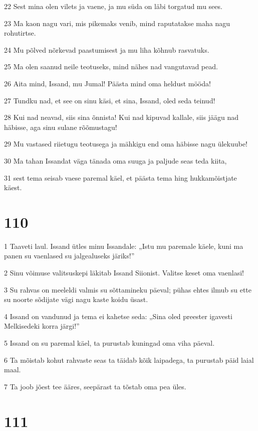 \par 22 Sest mina olen vilets ja vaene, ja mu süda on läbi torgatud mu sees.
\par 23 Ma kaon nagu vari, mis pikemaks venib, mind raputatakse maha nagu rohutirtse.
\par 24 Mu põlved nõrkevad paastumisest ja mu liha kõhnub rasvatuks.
\par 25 Ma olen saanud neile teotuseks, mind nähes nad vangutavad pead.
\par 26 Aita mind, Issand, mu Jumal! Päästa mind oma heldust mööda!
\par 27 Tundku nad, et see on sinu käsi, et sina, Issand, oled seda teinud!
\par 28 Kui nad neavad, siis sina õnnista! Kui nad kipuvad kallale, siis jäägu nad häbisse, aga sinu sulane rõõmustagu!
\par 29 Mu vastased riietugu teotusega ja mähkigu end oma häbisse nagu ülekuube!
\par 30 Ma tahan Issandat väga tänada oma suuga ja paljude seas teda kiita,
\par 31 sest tema seisab vaese paremal käel, et päästa tema hing hukkamõistjate käest.

\chapter{110}

\par 1 Taaveti laul. Issand ütles minu Issandale: „Istu mu paremale käele, kuni ma panen su vaenlased su jalgealuseks järiks!”
\par 2 Sinu võimuse valitsuskepi läkitab Issand Siionist. Valitse keset oma vaenlasi!
\par 3 Su rahvas on meeleldi valmis su sõttamineku päeval; pühas ehtes ilmub su ette su noorte sõdijate vägi nagu kaste koidu üsast.
\par 4 Issand on vandunud ja tema ei kahetse seda: „Sina oled preester igavesti Melkisedeki korra järgi!”
\par 5 Issand on su paremal käel, ta purustab kuningad oma viha päeval.
\par 6 Ta mõistab kohut rahvaste seas ta täidab kõik laipadega, ta purustab päid laial maal.
\par 7 Ta joob jõest tee ääres, seepärast ta tõstab oma pea üles.

\chapter{111}

